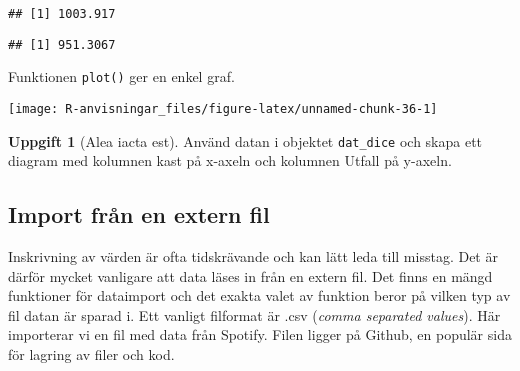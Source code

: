 \documentclass[
]{book}
\newenvironment{Shaded}{\begin{snugshade}}{\end{snugshade}}
\newcommand{\FunctionTok}[1]{\textcolor[rgb]{0.00,0.00,0.00}{#1}}
\newcommand{\NormalTok}[1]{#1}
\newcommand{\SpecialCharTok}[1]{\textcolor[rgb]{0.00,0.00,0.00}{#1}}
\theoremstyle{definition}
\theoremstyle{definition}
\theoremstyle{definition}
\newtheorem{exercise}{Uppgift}[chapter]
\theoremstyle{definition}
\theoremstyle{remark}
\begin{document}
\begin{verbatim}
## [1] 1003.917
\end{verbatim}

\begin{Shaded}
\end{Shaded}

\begin{verbatim}
## [1] 951.3067
\end{verbatim}

Funktionen \texttt{plot()} ger en enkel graf.

\begin{Shaded}
\end{Shaded}

\begin{center}\texttt{[image: R-anvisningar\_files/figure-latex/unnamed-chunk-36-1]} \end{center}

\begin{exercise}[Alea iacta est]

Använd datan i objektet \texttt{dat\_dice} och skapa ett diagram med kolumnen kast på x-axeln och kolumnen Utfall på y-axeln.

\begin{Shaded}
\end{Shaded}

\end{exercise}

\hypertarget{import-fruxe5n-en-extern-fil}{%
\subsection{Import från en extern fil}\label{import-fruxe5n-en-extern-fil}}

Inskrivning av värden är ofta tidskrävande och kan lätt leda till misstag. Det är därför mycket vanligare att data läses in från en extern fil. Det finns en mängd funktioner för dataimport och det exakta valet av funktion beror på vilken typ av fil datan är sparad i. Ett vanligt filformat är .csv (\emph{comma separated values}). Här importerar vi en fil med data från Spotify. Filen ligger på Github, en populär sida för lagring av filer och kod.
\end{document}
